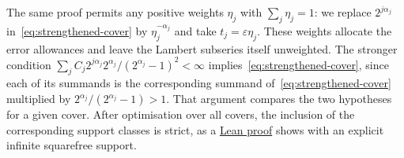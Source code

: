 \documentclass[11pt]{article}
\begin{document}
The same proof permits any positive weights $\eta_j$ with
$\sum_j\eta_j=1$: we replace $2^{j\alpha_j}$
in~\eqref{eq:strengthened-cover} by $\eta_j^{-\alpha_j}$ and take
$t_j=\varepsilon\eta_j$. These weights allocate the error allowances
and leave the Lambert subseries itself unweighted. The stronger
condition
$\sum_jC_j2^{j\alpha_j}2^{\alpha_j}/(2^{\alpha_j}-1)^2<\infty$
implies~\eqref{eq:strengthened-cover}, since each of its summands is
the corresponding summand of~\eqref{eq:strengthened-cover} multiplied
by $2^{\alpha_j}/(2^{\alpha_j}-1)>1$. That argument compares the two
hypotheses for a given cover. After optimisation over all covers, the
inclusion of the corresponding support classes is strict, as a
\href{https://github.com/wcook04/plectis-erdos/blob/3973d3b10bce72017b8f60093f0d6c3f4f592d80/lean/ErdosProblems/Erdos257/PaperCompleteR8/AnalyticIncomparability.lean\#L41}{Lean proof}
shows with an explicit infinite squarefree support.
\end{document}
